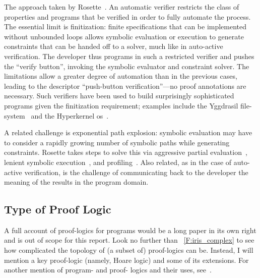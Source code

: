 The approach taken by Rosette~\cite{Torlak_2013}. An automatic verifier
restricts the class of properties and programs that be verified in order to
fully automate the process. The essential limit is finitization: finite
specifications that can be implemented without unbounded loops allows symbolic
evaluation or execution to generate constraints that can be handed off to a
solver, much like in auto-active verification. The developer thus programs in
such a restricted verifier and pushes the ``verify button'', invoking the symbolic
evaluator and constraint solver. The limitations allow a greater degree of
automation than in the previous cases, leading to the descriptor ``push-button
verification''---no proof annotations are necessary. Such verifiers have been used
to build surprisingly sophisticated programs given the finitization requirement;
examples include the Yggdrasil file-system~\cite{Sigurbjarnarson_2016} and the
Hyperkernel \gls{os}~\cite{Nelson_2017}.

A related challenge is exponential path explosion: symbolic evaluation may have
to consider a rapidly growing number of symbolic paths while generating
constraints. Rosette takes steps to solve this via aggressive partial
evaluation~\cite{Torlak_2013,Torlak_2014}, lenient symbolic
execution~\cite{Chang_2018}, and
profiling~\cite{Bornholt_2018,Porncharoenwase_2020}. Also related, as in the
case of auto-active verification, is the challenge of communicating back to the
developer the meaning of the results in the program domain.

\subsection{Type of Proof Logic}\label{S:t_logic}

A full account of proof-logics for programs would be a long paper in its own
right and is out of scope for this report. Look no further than
\figurename~\ref{F:iris_complex} to see how complicated the topology of (a
subset of) proof-logics can be. Instead, I will mention a key proof-logic
(namely, Hoare logic) and some of its extensions. For another mention of
program- and proof- logics and their uses, see~\cite[\S 5]{Appel_2011}.

